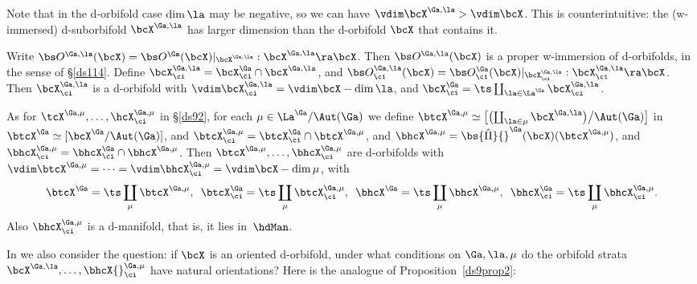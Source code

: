 \documentclass{article}
\begin{document}
\begin{dfn}
Note that in the d-orbifold case $\dim\la$ may be negative, so we
can have $\vdim\bcX^{\Ga,\la}>\vdim\bcX$. This is counterintuitive:
the (w-immersed) d-suborbifold $\bcX^{\Ga,\la}$ has larger dimension
than the d-orbifold $\bcX$ that contains it.

Write $\bs O^{\Ga,\la}(\bcX)=\bs O^\Ga(\bcX)\vert_{\smash{
\bcX^{\Ga,\la}}}:\bcX^{\Ga,\la}\ra\bcX$. Then $\bs
O^{\Ga,\la}(\bcX)$ is a proper w-immersion of d-orbifolds, in the
sense of \S\ref{ds114}. Define
$\bcX^{\Ga,\la}_\ci=\bcX^\Ga_\ci\cap\bcX^{\Ga,\la}$, and $\bs
O^{\Ga,\la}_\ci(\bcX)=\bs O^\Ga_\ci(\bcX)\vert_{\smash{
\bcX^{\Ga,\la}_\ci}}:\bcX^{\Ga,\la}_\ci\ra\bcX$. Then
$\bcX^{\Ga,\la}_\ci$ is a d-orbifold with
$\vdim\bcX^{\Ga,\la}_\ci=\vdim\bcX-\dim\la$, and
$\bcX^\Ga_\ci=\ts\coprod_{\smash{\la\in\La^\Ga}}\bcX^{\Ga,\la}_\ci$.

As for $\tcX^{\Ga,\mu},\ldots,\hcX^{\Ga,\mu}_\ci$ in \S\ref{ds92},
for each $\mu\in\La^\Ga/\Aut(\Ga)$ we define
$\btcX^{\Ga,\mu}\simeq\bigl[\bigl(\coprod_{\la\in\mu}\bcX^{\Ga,\la}
\bigr)\big/\Aut(\Ga)\bigr]$ in $\btcX^\Ga\simeq
[\bcX^\Ga/\Aut(\Ga)]$, and
$\btcX^{\Ga,\mu}_\ci=\btcX^\Ga_\ci\cap\btcX^{\Ga,\mu}$, and
$\bhcX^{\Ga,\mu}=\bs{\hat\Pi}{}^\Ga(\bcX)(\btcX^{\Ga,\mu})$, and
$\bhcX^{\Ga,\mu}_\ci= \bhcX^\Ga_\ci\cap \bhcX^{\Ga,\mu}$. Then
$\btcX^{\Ga,\mu},\ldots,\bhcX^{\Ga,\mu}_\ci$ are d-orbifolds with
$\vdim\btcX^{\Ga,\mu}=\cdots=\vdim\bhcX^{\Ga,\mu}_\ci=\vdim\bcX-\dim\mu$,
with
\begin{equation*}
\btcX^\Ga=\ts\coprod_\mu\btcX^{\Ga,\mu},\;\>
\btcX^\Ga_\ci=\ts\coprod_\mu \btcX^{\Ga,\mu}_\ci,\;\>
\bhcX^\Ga=\ts\coprod_\mu \bhcX^{\Ga,\mu},\;\>
\bhcX^\Ga_\ci=\ts\coprod_\mu \bhcX^{\Ga,\mu}_\ci.
\end{equation*}
Also $\bhcX^{\Ga,\mu}_\ci$ is a d-manifold, that is, it lies
in~$\hdMan$.
\label{ds11def4}
\end{dfn}

In \cite[\S 10.7]{Joyc6} we also consider the question: if
$\bcX$ is an oriented d-orbifold, under what conditions on
$\Ga,\la,\mu$ do the orbifold strata
$\bcX^{\Ga,\la},\ldots,\bhcX{}^{\Ga,\mu}_\ci$ have natural
orientations? Here is the analogue of Proposition~\ref{ds9prop2}:
\end{document}
